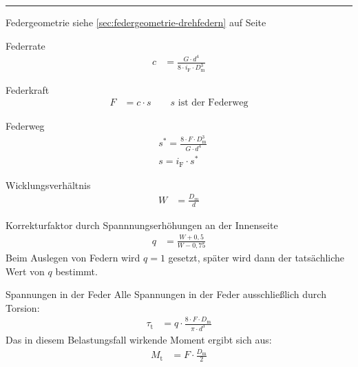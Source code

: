 \hrule
\begin{eeqn}{Federgeometrie}
	\vspace{5pt} siehe \ref{sec:federgeometrie-drehfedern} auf Seite \pageref{sec:federgeometrie-drehfedern}
\end{eeqn}

\begin{eeqn}{Federrate}
	\begin{align}
		c &= \frac{G \cdot d^4}{8\cdot i_\text{F} \cdot D_\text{m}^3}
	\end{align}
\end{eeqn}

\begin{eeqn}{Federkraft}
	\begin{align}
		F &= c \cdot s \qquad \text{$s$ ist der Federweg} 
	\end{align}
\end{eeqn}

\begin{eeqn}{Federweg}
	\begin{align}
		& s^* = \frac{8\cdot F \cdot D_\text{m}^3}{G\cdot d^4} \\
		& s = i_\text{F} \cdot s^*
	\end{align}
\end{eeqn}

\begin{eeqn}{Wicklungsverhältnis}
	\begin{align}
		W &= \frac{D_m}{d}
	\end{align}
\end{eeqn}

\begin{eeqn}{Korrekturfaktor durch Spannnungserhöhungen an der Innenseite}
	\begin{align}
		q & = \frac{W+0,5}{W-0,75}
	\end{align}
	Beim Auslegen von Federn wird $q=1$ gesetzt, später wird dann der tatsächliche Wert von $q$ bestimmt.
\end{eeqn}

\enlargethispage{\baselineskip}

\begin{eeqn}{Spannungen in der Feder}
	Alle Spannungen in der Feder ausschließlich durch Torsion:
	\begin{align}
		\tau_\text{t} &= q \cdot \frac{8 \cdot F \cdot  D_\text{m}}{\pi \cdot d^3}
	\end{align}
	Das in diesem Belastungsfall wirkende Moment ergibt sich aus:
	\begin{align}
		M_\text{t} &= F \cdot \frac{D_\text{m}}{2}
	\end{align}
\end{eeqn}

